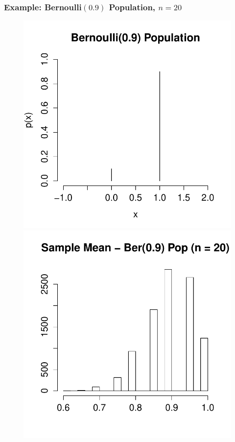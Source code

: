 \begin{frame}
\frametitle{Example: Bernoulli$(0.9)$ Population, $n =20$}
\begin{figure}
\centering
\includegraphics[scale = 0.4]{./images/bernoulli_bad}
\includegraphics[scale = 0.4]{./images/xbar_bernoulli_bad}
\end{figure}
\end{frame}
